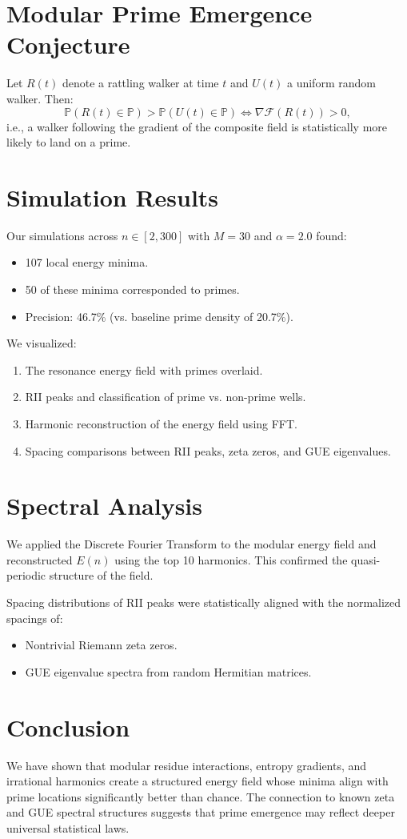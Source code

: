 \documentclass[12pt]{article}
\begin{document}
\section{Modular Prime Emergence Conjecture}
Let $R(t)$ denote a rattling walker at time $t$ and $U(t)$ a uniform random walker. Then:
\[
\mathbb{P}(R(t) \in \mathbb{P}) > \mathbb{P}(U(t) \in \mathbb{P}) \iff \nabla \mathcal{F}(R(t)) > 0,
\]
i.e., a walker following the gradient of the composite field is statistically more likely to land on a prime.

\section{Simulation Results}
Our simulations across $n \in [2, 300]$ with $M = 30$ and $\alpha = 2.0$ found:
\begin{itemize}
    \item 107 local energy minima.
    \item 50 of these minima corresponded to primes.
    \item Precision: 46.7\% (vs. baseline prime density of 20.7\%).
\end{itemize}

We visualized:
\begin{enumerate}
    \item The resonance energy field with primes overlaid.
    \item RII peaks and classification of prime vs. non-prime wells.
    \item Harmonic reconstruction of the energy field using FFT.
    \item Spacing comparisons between RII peaks, zeta zeros, and GUE eigenvalues.
\end{enumerate}

\section{Spectral Analysis}
We applied the Discrete Fourier Transform to the modular energy field and reconstructed $E(n)$ using the top 10 harmonics. This confirmed the quasi-periodic structure of the field.

Spacing distributions of RII peaks were statistically aligned with the normalized spacings of:
\begin{itemize}
    \item Nontrivial Riemann zeta zeros.
    \item GUE eigenvalue spectra from random Hermitian matrices.
\end{itemize}

\section{Conclusion}
We have shown that modular residue interactions, entropy gradients, and irrational harmonics create a structured energy field whose minima align with prime locations significantly better than chance. The connection to known zeta and GUE spectral structures suggests that prime emergence may reflect deeper universal statistical laws.
\end{document}

